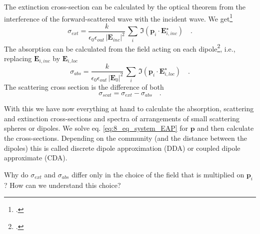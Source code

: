 The extinction cross-section can be calculated by the optical theorem from the interference of the forward-scattered wave with the incident wave. We get\footcite{Draine88,Yurkin07}
\begin{equation}
\sigma_{ext} = \frac{k}{\epsilon_0 \epsilon_{out}  \, |\mathbf{E}_{inc}|^2} \, \sum_i \, \Im ( \mathbf{p}_i \cdot \mathbf{E}_{i, inc}^\star ) \quad .
\end{equation}
 The absorption can be calculated from the field acting on each dipole\footcite{Yurkin07}, i.e., replacing $\mathbf{E}_{i, inc} $ by $\mathbf{E}_{i, loc} $ 
 \begin{equation}
\sigma_{abs} = \frac{k}{\epsilon_0 \epsilon_{out}  \, |\mathbf{E}_{0}|^2} \, \sum_i \, \Im ( \mathbf{p}_i \cdot \mathbf{E}_{i, loc}^\star ) \quad .
\end{equation}
The scattering cross section is the difference of both
\begin{equation}
\sigma_{scat} = \sigma_{ext}  - \sigma_{abs} \quad .
\end{equation}
 
With this we have now everything at hand to calculate the absorption, scattering and extinction cross-sections and spectra of arrangements  of small scattering spheres or dipoles. We solve eq. \ref{eq:8_eq_system_EAP} for $\mathbf{p}$ and then calculate the cross-sections. Depending on the community (and the distance between the dipoles) this is called discrete dipole approximation (DDA) or coupled dipole approximate (CDA).
 
 
\begin{questions}
\item Why do $\sigma_{ext}$ and $\sigma_{abs}$ differ only in  the choice of the field that is multiplied on $\mathbf{p}_i$? How can we understand this choice?
\end{questions}

 


